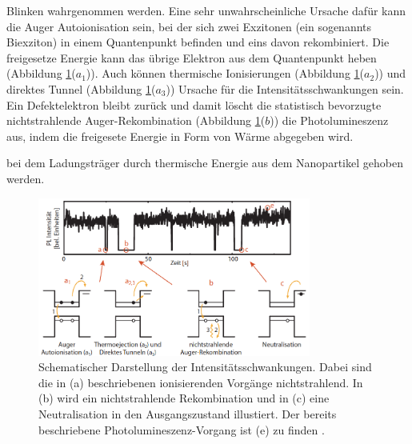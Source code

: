 Blinken wahrgenommen werden. Eine sehr unwahrscheinliche Ursache dafür kann die
Auger Autoionisation sein, bei der sich zwei Exzitonen (ein sogenannts Biexziton)
in einem Quantenpunkt befinden und eins davon rekombiniert. Die freigesetze Energie
kann das übrige Elektron aus dem Quantenpunkt heben (Abbildung \ref{fig:blink}($a_1$)).
Auch können thermische Ionisierungen (Abbildung \ref{fig:blink}($a_2$)) und
direktes Tunnel (Abbildung \ref{fig:blink}($a_3$)) Ursache für die
Intensitätsschwankungen sein. Ein Defektelektron bleibt zurück und damit löscht
die statistisch bevorzugte nichtstrahlende Auger-Rekombination (Abbildung
\ref{fig:blink}($b$)) die Photolumineszenz aus, indem die freigesete Energie in
Form von Wärme abgegeben wird.

bei dem Ladungsträger durch thermische Energie aus dem Nanopartikel gehoben werden.
\begin{figure}[hbtp]
	\centering
	\includegraphics[width=0.8\textwidth]{Abb/blink.png}
	\caption{Schematischer Darstellung der Intensitätsschwankungen. Dabei sind die
	in (a) beschriebenen ionisierenden Vorgänge nichtstrahlend. In (b) wird ein
	nichtstrahlende Rekombination und in (c) eine Neutralisation in den Ausgangszustand
	illustiert. Der bereits beschriebene Photolumineszenz-Vorgang ist (e) zu finden
	\cite{blink}.}
	\label{fig:blink}
\end{figure}
\noindent
